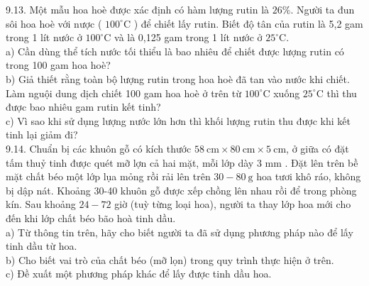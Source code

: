 \documentclass[10pt]{article}
\begin{document}
9.13. Một mẫu hoa hoè được xác định có hàm lượng rutin là $26 \%$. Người ta đun sôi hoa hoè với nược ( $100^{\circ} \mathrm{C}$ ) để chiết lấy rutin. Biết độ tân của rutin là 5,2 gam trong 1 lít nước ở $100^{\circ} \mathrm{C}$ và là 0,125 gam trong 1 lít nước ở $25^{\circ} \mathrm{C}$.\\
a) Cần dùng thể tích nước tối thiểu là bao nhiêu để chiết được lượng rutin có trong 100 gam hoa hoè?\\
b) Giả thiết rằng toàn bộ lượng rutin trong hoa hoè đã tan vào nước khi chiết. Làm nguội dung dịch chiết 100 gam hoa hoè ở trên từ $100^{\circ} \mathrm{C}$ xuống $25^{\circ} \mathrm{C}$ thì thu được bao nhiêu gam rutin kết tinh?\\
c) Vì sao khi sử dụng lượng nước lớn hơn thì khối lượng rutin thu được khi kết tinh lại giảm đi?\\
9.14. Chuẩn bị các khuôn gỗ có kích thước $58 \mathrm{~cm} \times 80 \mathrm{~cm} \times 5 \mathrm{~cm}$, ở giữa có đặt tấm thuỷ tinh được quét mỡ lợn cả hai mặt, mỗi lớp dày 3 mm . Đặt lên trên bề mặt chất béo một lớp lụa mỏng rồi rải lên trên $30-80 \mathrm{~g}$ hoa tươi khô ráo, không bị dập nát. Khoảng 30-40 khuôn gỗ được xếp chồng lên nhau rồi để trong phòng kín. Sau khoảng $24-72$ giờ (tuỳ từng loại hoa), người ta thay lớp hoa mới cho đến khi lớp chất béo bão hoà tinh dầu.\\
a) Từ thông tin trên, hãy cho biết người ta đã sử dụng phương pháp nào để lấy tinh dầu từ hoa.\\
b) Cho biết vai trò của chất béo (mỡ lọn) trong quy trình thực hiện ở trên.\\
c) Đề xuất một phương pháp khác để lấy được tinh dầu hoa.
\end{document}
